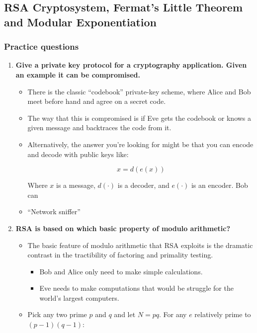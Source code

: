\documentclass[a4paper,11pt]{article}
\begin{document}
\subsection{RSA Cryptosystem, Fermat's Little Theorem and Modular
Exponentiation}\label{rsa-cryptosystem-fermats-little-theorem-and-modular-exponentiation}

\subsubsection{Practice questions}\label{practice-questions-2}

\begin{enumerate}
\def\labelenumi{\arabic{enumi}.}
\item
  \textbf{Give a private key protocol for a cryptography application.
  Given an example it can be compromised.}

  \begin{itemize}
  \item
    There is the classic ``codebook'' private-key scheme, where Alice
    and Bob meet before hand and agree on a secret code.
  \item
    The way that this is compromised is if Eve gets the codebook or
    knows a given message and backtraces the code from it.
  \item
    Alternatively, the answer you're looking for might be that you can
    encode and decode with public keys like:

    \[x = d(e(x))\]

    Where $x$ is a message, $d(\cdot)$ is a decoder, and $e(\cdot)$ is
    an encoder. Bob can
  \item
    ``Network sniffer''
  \end{itemize}
\item
  \textbf{RSA is based on which basic property of modulo arithmetic?}

  \begin{itemize}
  \item
    The basic feature of modulo arithmetic that RSA exploits is the
    dramatic contrast in the tractibility of factoring and primality
    testing.

    \begin{itemize}
    \itemsep1pt\parskip0pt
    \item
      Bob and Alice only need to make simple calculations.
    \item
      Eve needs to make computations that would be struggle for the
      world's largest computers.
    \end{itemize}
  \item
    Pick any two prime $p$ and $q$ and let $N = pq$. For any $e$
    relatively prime to $(p - 1)(q - 1)$:


\end{itemize}
\end{enumerate}
\end{document}
